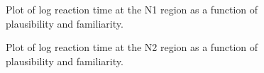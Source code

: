 \documentclass[
  12pt,
  letterpaper,
]{scrreport}
\begin{document}
\begin{figure}[htbp]

\caption{\label{fig-N1Staub}Plot of log reaction time at the N1 region
as a function of plausibility and familiarity.}


\end{figure}%

\begin{figure}[htbp]

\caption{\label{fig-N2Staub}Plot of log reaction time at the N2 region
as a function of plausibility and familiarity.}


\end{figure}%
\end{document}
